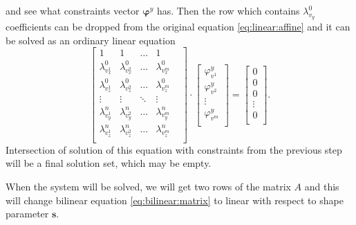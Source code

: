 and see what constraints vector $\pmb{\varphi}^y$ has.
Then the row which contains $\lambda^0_{v_y}$ coefficients
can be dropped from the original equation \eqref{eq:linear:affine}
and it can be solved as an ordinary linear equation
\begin{equation*}
  \begin{bmatrix}
    1                 & 1                 & \dots  & 1                 & \\
    \lambda^0_{v^1_x} & \lambda^0_{v^2_x} & \dots  & \lambda^0_{v^m_x} & \\
    \lambda^0_{v^1_z} & \lambda^0_{v^2_z} & \dots  & \lambda^0_{v^m_z} & \\
    \vdots            & \vdots            & \ddots & \vdots            & \\
    \lambda^n_{v^1_y} & \lambda^n_{v^2_y} & \dots  & \lambda^n_{v^m_y} & \\
    \lambda^n_{v^1_z} & \lambda^n_{v^2_z} & \dots  & \lambda^n_{v^m_z} & \\
  \end{bmatrix}
  \cdot
  \begin{bmatrix}
    \varphi^y_{v^1} \\
    \varphi^y_{v^2} \\
    \vdots          \\
    \varphi^y_{v^m} \\
  \end{bmatrix}
  =
  \begin{bmatrix}
    0       \\
    0       \\
    0       \\
    \vdots  \\
    0       \\
  \end{bmatrix}.
\end{equation*}
Intersection of solution of this equation
with constraints from the previous step
will be a final solution set, which may be empty.

When the system will be solved,
we will get two rows of the matrix $A$
and this will change bilinear equation \eqref{eq:bilinear:matrix}
to linear with respect to shape parameter $\pmb{s}$.

